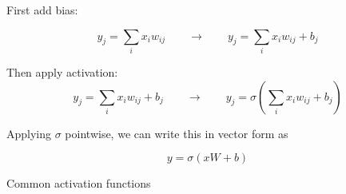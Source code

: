 \begin{frame}
    
    First add bias:

    \begin{equation*}
        y_j = \sum_i x_i w_{ij}        
        \qquad \to \qquad
        y_j = \sum_i  x_i w_{ij} + b_j
    \end{equation*}

    Then apply activation:
    \begin{equation*}
        y_j = \sum_i x_i w_{ij} + b_j
        \qquad \to \qquad
        y_j = \sigma \left(\sum_i x_i w_{ij} + b_j \right)
    \end{equation*}

    Applying $\sigma$ pointwise, we can write this in vector form as
    
    \begin{equation*}
        y = \sigma(x W + b)
    \end{equation*}

    
\end{frame}

\begin{frame}{Common activation functions}
    
    \begin{figure}
       \centering
    \end{figure}

\end{frame}


